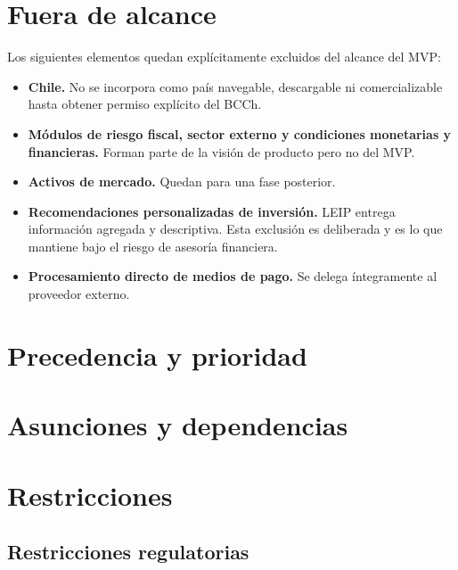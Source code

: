 \documentclass[11pt,a4paper]{article}
\newcommand{\proyectoNombre}{LEIP}
\begin{document}


\section{Fuera de alcance}

Los siguientes elementos quedan expl\'icitamente excluidos del alcance del MVP:

\begin{itemize}
  \item \textbf{Chile.} No se incorpora como pa\'is navegable, descargable ni
        comercializable hasta obtener permiso expl\'icito del BCCh.
  \item \textbf{M\'odulos de riesgo fiscal, sector externo y condiciones
        monetarias y financieras.} Forman parte de la visi\'on de producto pero
        no del MVP.
  \item \textbf{Activos de mercado.} Quedan para una fase posterior.
  \item \textbf{Recomendaciones personalizadas de inversi\'on.} \proyectoNombre{}
        entrega informaci\'on agregada y descriptiva. Esta exclusi\'on es
        deliberada y es lo que mantiene bajo el riesgo de asesor\'ia financiera.
  \item \textbf{Procesamiento directo de medios de pago.} Se delega
        \'integramente al proveedor externo.
\end{itemize}

\section{Precedencia y prioridad}

\section{Asunciones y dependencias}

\section{Restricciones}
\label{sec:restricciones}

\subsection{Restricciones regulatorias}
\end{document}
